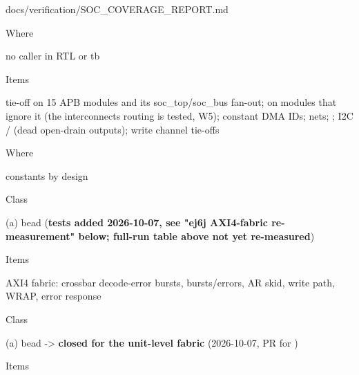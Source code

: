 \begin{relocated}{docs/verification/SOC_COVERAGE_REPORT.md}
\begin{rowtable}
\begin{rowcell}{Where}

no caller in RTL or tb

\end{rowcell}


\begin{rowcell}{Items}

 tie-off on 15 APB modules and its
soc\_\allowbreak{}top/\allowbreak{}soc\_\allowbreak{}bus fan-out;
 on modules that ignore it (the
interconnect\textquotesingle s routing is tested,  W5); constant
DMA IDs;  nets; ; I2C
/ (dead open-drain outputs);
 write channel tie-offs

\end{rowcell}

\begin{rowcell}{Where}

constants by design

\end{rowcell}


\begin{rowcell}{Class}

(a) bead  (\textbf{tests added 2026-10-07, see "ej6j
AXI4-fabric re-measurement" below; full-run table above not yet
re-measured})

\end{rowcell}

\begin{rowcell}{Items}

AXI4 fabric: crossbar decode-error bursts, 
bursts/\allowbreak{}errors,  AR skid,
 write path,  WRAP,
 error response

\end{rowcell}


\begin{rowcell}{Class}

(a) bead  -\textgreater{} \textbf{closed for the unit-level
fabric} (2026-10-07, PR for )

\end{rowcell}

\begin{rowcell}{Items}


\end{rowcell}
\end{rowtable}
\end{relocated}
